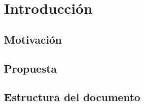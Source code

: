 \chapter{Introducción}
\label{cap:Introduccion}

\section{Motivación}
\label{sec:Motivacion}

\section{Propuesta}
\label{sec:Propuesta}

\section{Estructura del documento}
\label{sec:Estructura}